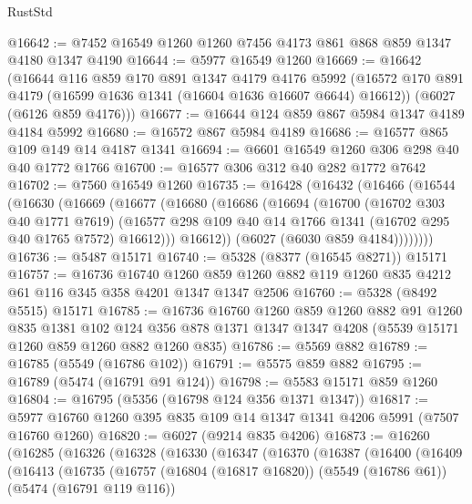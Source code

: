 \begin{lexlean}{RustStd}
\begin{coremodule}
@16642 := @7452 @16549 @1260 @1260 @7456 @4173 @861 @868 @859 @1347 @4180 @1347 @4190
@16644 := @5977 @16549 @1260
@16669 := @16642
    (@16644
      @116
      @859
      @170
      @891
      @1347
      @4179
      @4176
      @5992
      (@16572 @170 @891 @4179 (@16599 @1636 @1341 (@16604 @1636 @16607 @6644) @16612))
      (@6027 (@6126 @859 @4176)))
@16677 := @16644 @124 @859 @867 @5984 @1347 @4189 @4184 @5992
@16680 := @16572 @867 @5984 @4189
@16686 := @16577 @865 @109 @149 @14 @4187 @1341
@16694 := @6601 @16549 @1260 @306 @298 @40 @40 @1772 @1766
@16700 := @16577 @306 @312 @40 @282 @1772 @7642
@16702 := @7560 @16549 @1260
@16735 := @16428
    (@16432
      (@16466
        (@16544
          (@16630
            (@16669
              (@16677
                (@16680
                  (@16686
                    (@16694
                      (@16700
                        (@16702 @303 @40 @1771 @7619)
                        (@16577
                          @298
                          @109
                          @40
                          @14
                          @1766
                          @1341
                          (@16702 @295 @40 @1765 @7572)
                          @16612)))
                    @16612))
                (@6027 (@6030 @859 @4184))))))))
@16736 := @5487 @15171
@16740 := @5328 (@8377 (@16545 @8271)) @15171
@16757 := @16736
    @16740
    @1260
    @859
    @1260
    @882
    @119
    @1260
    @835
    @4212
    @61
    @116
    @345
    @358
    @4201
    @1347
    @1347
    @2506
@16760 := @5328 (@8492 @5515) @15171
@16785 := @16736
    @16760
    @1260
    @859
    @1260
    @882
    @91
    @1260
    @835
    @1381
    @102
    @124
    @356
    @878
    @1371
    @1347
    @1347
    @4208
    (@5539 @15171 @1260 @859 @1260 @882 @1260 @835)
@16786 := @5569 @882
@16789 := @16785 (@5549 (@16786 @102))
@16791 := @5575 @859 @882
@16795 := @16789 (@5474 (@16791 @91 @124))
@16798 := @5583 @15171 @859 @1260
@16804 := @16795 (@5356 (@16798 @124 @356 @1371 @1347))
@16817 := @5977 @16760 @1260 @395 @835 @109 @14 @1347 @1341 @4206 @5991 (@7507 @16760 @1260)
@16820 := @6027 (@9214 @835 @4206)
@16873 := @16260
    (@16285
      (@16326
        (@16328
          (@16330
            (@16347
              (@16370
                (@16387
                  (@16400
                    (@16409
                      (@16413
                        (@16735
                          (@16757
                            (@16804 (@16817 @16820))
                            (@5549 (@16786 @61))
                            (@5474 (@16791 @119 @116))

\end{coremodule}
\end{lexlean}
